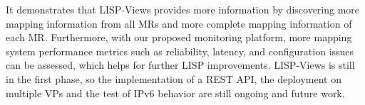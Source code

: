 It demonstrates that LISP-Views provides more information by discovering more mapping information from all MRs and more complete mapping information of each MR. Furthermore, with our proposed monitoring platform, more mapping system performance metrics such as reliability, latency, and configuration issues can be assessed, which helps for further LISP improvements. LISP-Views is still in the first phase, so the implementation of a REST API, the deployment on multiple VPs and the test of IPv6 behavior are still ongoing and future work. 